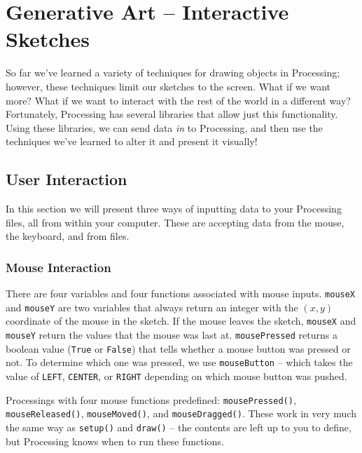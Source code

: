 \section{Generative Art -- Interactive Sketches}
So far we've learned a variety of techniques for drawing objects in Processing; however, these techniques limit our sketches to the screen.  What if we want more?  What if we want to interact with the rest of the world in a different way?  Fortunately, Processing has several libraries that allow just this functionality.  Using these libraries, we can send data \emph{in} to Processing, and then use the techniques we've learned to alter it and present it visually!

\subsection{User Interaction}
In this section we will present three ways of inputting data to your Processing files, all from within your computer.  These are accepting data from the mouse, the keyboard, and from files.

\subsubsection{Mouse Interaction}
There are four variables and four functions associated with mouse inputs.  \texttt{mouseX} and \texttt{mouseY} are two variables that always return an integer with the $(x,y)$ coordinate of the mouse in the sketch.  If the mouse leaves the sketch, \texttt{mouseX} and \texttt{mouseY} return the values that the mouse was last at.  \texttt{mousePressed} returns a boolean value (\texttt{True} or \texttt{False}) that tells whether a mouse button was pressed or not.  To determine which one was pressed, we use \texttt{mouseButton} -- which takes the value of \texttt{LEFT}, \texttt{CENTER}, or \texttt{RIGHT} depending on which mouse button was pushed.

Processings with four mouse functions predefined: \texttt{mousePressed()}, \texttt{mouseReleased()}, \texttt{mouseMoved()}, and \texttt{mouseDragged()}.  These work in very much the same way as \texttt{setup()} and \texttt{draw()} -- the contents are left up to you to define, but Processing knows when to run these functions.

